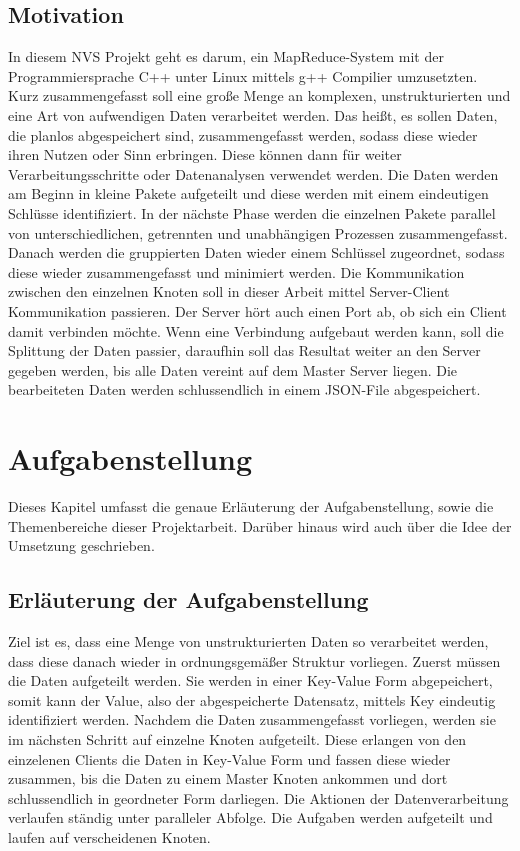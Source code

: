 \documentclass[a4paper,12pt]{article}
\begin{document}
\subsection{Motivation}
In diesem NVS Projekt geht es darum, ein MapReduce-System mit der Programmiersprache C++ unter Linux mittels g++ Compilier umzusetzten.
Kurz zusammengefasst soll eine große Menge an komplexen, unstrukturierten und eine Art von aufwendigen Daten verarbeitet werden. 
Das heißt, es sollen Daten, die planlos abgespeichert sind, zusammengefasst werden, sodass diese wieder ihren Nutzen oder Sinn erbringen. 
Diese können dann für weiter Verarbeitungsschritte oder Datenanalysen verwendet werden. Die Daten werden am Beginn in kleine 
Pakete aufgeteilt und diese werden mit einem eindeutigen
Schlüsse identifiziert. 
In der nächste Phase werden die einzelnen Pakete parallel von unterschiedlichen, getrennten und unabhängigen Prozessen 
zusammengefasst. Danach werden die gruppierten Daten wieder 
einem Schlüssel zugeordnet, sodass diese wieder zusammengefasst und minimiert werden. Die Kommunikation zwischen den einzelnen 
Knoten soll in dieser Arbeit mittel Server-Client Kommunikation passieren.
Der Server hört auch einen Port ab, ob sich ein Client damit verbinden möchte. Wenn eine Verbindung aufgebaut werden kann, soll die 
Splittung der Daten passier, daraufhin soll das Resultat weiter an den Server gegeben werden, bis 
alle Daten vereint auf dem Master Server liegen. Die bearbeiteten Daten werden schlussendlich in einem JSON-File abgespeichert.

\section{Aufgabenstellung}
Dieses Kapitel umfasst die genaue Erläuterung der Aufgabenstellung, sowie die Themenbereiche dieser Projektarbeit. Darüber hinaus wird auch über die Idee der Umsetzung geschrieben.
\subsection{Erläuterung der Aufgabenstellung}
Ziel ist es, dass eine Menge von unstrukturierten Daten so verarbeitet werden, dass diese danach wieder in ordnungsgemäßer 
Struktur vorliegen. Zuerst müssen die Daten aufgeteilt werden. Sie werden in einer Key-Value Form abgepeichert, somit kann
der Value, also der abgespeicherte Datensatz, mittels Key eindeutig identifiziert werden. Nachdem die Daten zusammengefasst vorliegen, 
werden sie im nächsten Schritt auf einzelne Knoten aufgeteilt. Diese erlangen von den einzelenen Clients die Daten in Key-Value Form und 
fassen diese wieder zusammen, bis die Daten zu einem Master Knoten ankommen und dort schlussendlich in geordneter Form darliegen.
Die Aktionen der Datenverarbeitung verlaufen ständig unter paralleler Abfolge. Die Aufgaben werden aufgeteilt und laufen auf 
verscheidenen Knoten.
\end{document}
